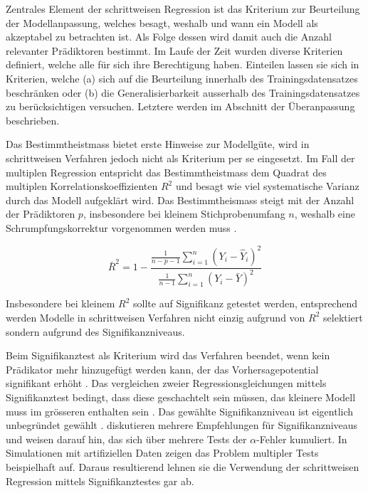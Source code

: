 Zentrales Element der schrittweisen Regression ist das Kriterium zur Beurteilung der  Modellanpassung, welches besagt, weshalb und wann ein Modell als akzeptabel zu betrachten ist. Als Folge dessen wird damit auch die Anzahl relevanter Prädiktoren bestimmt. Im Laufe der Zeit wurden diverse Kriterien definiert, welche alle für sich ihre Berechtigung haben.
Einteilen lassen sie sich in Kriterien, welche (a) sich auf die Beurteilung innerhalb des Trainingsdatensatzes beschränken oder (b) die Generalisierbarkeit ausserhalb des Trainingsdatensatzes zu berücksichtigen versuchen. Letztere werden im Abschnitt der Überanpassung beschrieben.

Das Bestimmtheistmass bietet erste Hinweise zur Modellgüte, wird in schrittweisen Verfahren jedoch nicht als Kriterium per se eingesetzt. 
Im Fall der multiplen Regression entspricht das Bestimmtheistmass  dem Quadrat des multiplen Korrelationskoeffizienten $R^2$ und  besagt wie viel systematische Varianz durch das Modell aufgeklärt  wird. 
Das Bestimmtheismass steigt mit der Anzahl der Prädiktoren $p$, insbesondere bei kleinem Stichprobenumfang $n$, weshalb eine Schrumpfungskorrektur vorgenommen werden muss \cite[p. 451]{bortz2011}. 

\begin{equation}
\bar R^2=1-\frac{\displaystyle \frac{1}{n-p-1} \sum_{i=1}^n (Y_i-\hat{Y}_i)^2}{\displaystyle \frac{1}{n-1} \sum_{i=1}^n (Y_i-\bar{Y})^2}
\tag{korrigiertes Bestimmtheitsmass}
\end{equation}

Insbesondere bei kleinem $R^2$ sollte auf Signifikanz getestet werden, entsprechend werden Modelle in schrittweisen Verfahren nicht einzig aufgrund von $R^2$ selektiert sondern aufgrund des Signifikanzniveaus. 

Beim Signifikanztest als Kriterium wird das Verfahren beendet, wenn kein Prädikator mehr hinzugefügt werden kann, der das Vorhersagepotential signifikant erhöht \cite[p.48]{bendel1977comparison}. 
Das vergleichen zweier Regressionsgleichungen mittels Signifikanztest bedingt, dass diese geschachtelt sein müssen, das kleinere Modell muss im grösseren enthalten sein \cite[p. 508]{jacob2003applied}.
Das gewählte Signifikanzniveau ist eigentlich unbegründet gewählt \cite[p. 174]{weakliem2004introduction}.  diskutieren mehrere Empfehlungen für Signifikanzniveaus und weisen darauf hin, das sich über mehrere Tests der $\alpha$-Fehler kumuliert. 
In  Simulationen mit artifiziellen Daten zeigen  das  Problem multipler Tests beispielhaft auf. 
Daraus resultierend lehnen sie die Verwendung der schrittweisen Regression mittels Signifikanztestes gar ab.

